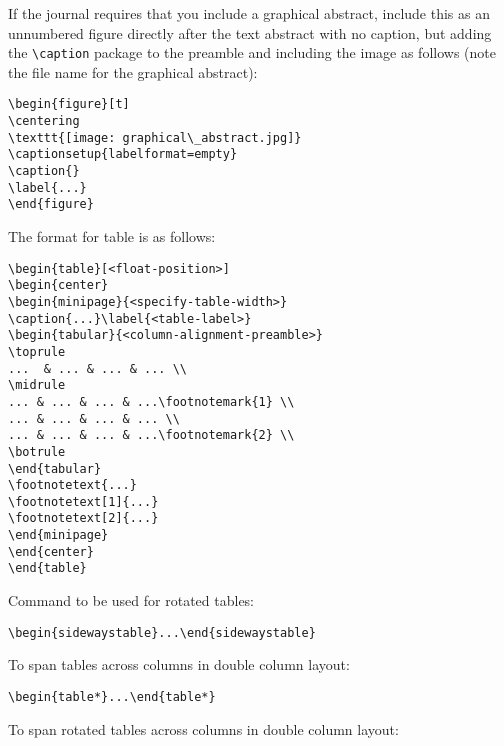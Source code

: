 \documentclass{article}
\begin{document}
If the journal requires that you include a graphical abstract, include this as an unnumbered figure directly after the text abstract with no caption, but adding the \verb+\caption+ package to the preamble and including the image as follows (note the file name for the graphical abstract):

\begin{verbatim}
\begin{figure}[t]
\centering
\texttt{[image: graphical\_abstract.jpg]}
\captionsetup{labelformat=empty}
\caption{}
\label{...}
\end{figure}
\end{verbatim}

The format for table is as follows:

\begin{verbatim}
\begin{table}[<float-position>]
\begin{center}
\begin{minipage}{<specify-table-width>}
\caption{...}\label{<table-label>}
\begin{tabular}{<column-alignment-preamble>}
\toprule
...  & ... & ... & ... \\
\midrule
... & ... & ... & ...\footnotemark{1} \\
... & ... & ... & ... \\
... & ... & ... & ...\footnotemark{2} \\
\botrule
\end{tabular}
\footnotetext{...}
\footnotetext[1]{...}
\footnotetext[2]{...}
\end{minipage}
\end{center}
\end{table}
\end{verbatim}

Command to be used for rotated tables:

\begin{verbatim}
\begin{sidewaystable}...\end{sidewaystable}
\end{verbatim}

To span tables across columns in double column layout:

\begin{verbatim}
\begin{table*}...\end{table*}
\end{verbatim}

To span rotated tables across columns in double column layout:
\end{document}
